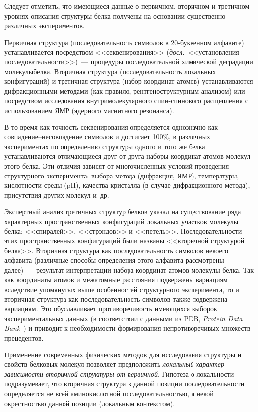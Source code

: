 \begin{multicols}{2}
Следует отметить, что имеющиеся данные о первичном, вторичном и
третичном уровнях описания структуры белка получены на основании
суще\-ст\-венно различных экспериментов. 

Первичная структура
(последовательность символов в 20-бук\-вен\-ном алфавите) \mbox{устанавливается}
посредством <<секвенирования>> (\textit{досл.}\ <<уста\-нов\-ления
по\-сле\-до\-ва\-тель\-ности>>)~--- процедуры после\-довательной химической
деградации молекулы\linebreak белка. Вторичная структура (последовательность %
локальных конфигураций) и третичная структура (набор координат атомов)
устанавливаются\linebreak
 дифракционными методами (как правило,
рентгеноструктурным анализом) или посредством исследования
внут\-ри\-мо\-ле\-ку\-ляр\-но\-го спин-спи\-но\-во\-го расщепления с использованием
ЯМР (ядерного магнитного резонанса).

В то время как точность секвенирования определяется однозначно как
совпадение--не\-сов\-па\-де\-ние символов и достигает 100\%, в различных
экспериментах по определению структуры одного и того же белка
устанавливаются отличающиеся друг от друга наборы координат атомов
молекул этого белка. Эти отличия зависят от многочисленных условий
проведения структурного эксперимента: выбора метода (дифракция, ЯМР),
температуры, кислотности среды (pH), качества кристалла (в случае
дифракционного метода), присутствия других молекул и~др.

Экспертный анализ третичных структур белков указал на существование
ряда характерных пространственных конфигураций локальных участков
молекулы белка: <<спиралей>>, <<стрэндов>> и <<петель>>.
Последовательности этих пространственных конфигураций были названы
<<вторичной структурой белка>>. Вторичная структура как
последовательность символов некоего алфавита (различные способы
определения этого алфавита рассмотрены далее)~--- результат интерпретации
набора координат атомов молекулы белка. Так как координаты атомов и
межатомные расстояния подвержены вариациям вследствие упомянутых
выше особенностей структурного эксперимента, то и вторичная структура
как последовательность символов также подвержена вариациям. Это
обуславливает противоречивость имеющихся выборок экспериментальных
данных (в соответствии с данными из PDB, \textit{Protein Data
Bank}~\cite{4-t}) и приводит к необходимости формирования
непротиворечивых множеств прецедентов.

Применение современных физических методов для исследования структуры
и свойств белковых молекул позволяет предположить \textit{локальный
характер зависимости вторичной структуры от первичной}. Гипотеза о
локальности подразумевает, что вторичная структура в данной позиции
последовательности определяется не всей аминокислотной
последовательностью, а некой окрестностью данной позиции (локальным
контекстом).


\end{multicols}
